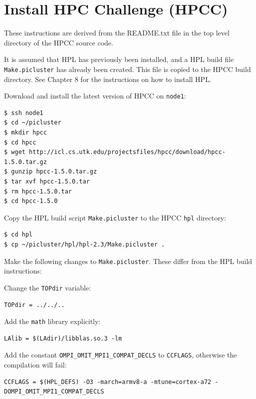\documentclass{report}
\begin{document}
%
%
\chapter{Install HPC Challenge (HPCC)}

These instructions are derived from the README.txt file in the top level directory of the HPCC source code.

It is assumed that HPL has previously been installed, and a HPL build file \verb|Make.picluster| has already been created. This file is copied to the HPCC build directory. See Chapter 8 for the instructions on how to install HPL.

Download and install the latest version of HPCC on \verb|node1|:

\lstset{style=type}
\begin{lstlisting}
$ ssh node1
$ cd ~/picluster
$ mkdir hpcc
$ cd hpcc
$ wget http://icl.cs.utk.edu/projectsfiles/hpcc/download/hpcc-1.5.0.tar.gz
$ gunzip hpcc-1.5.0.tar.gz
$ tar xvf hpcc-1.5.0.tar
$ rm hpcc-1.5.0.tar
$ cd hpcc-1.5.0
\end{lstlisting}

Copy the HPL build script \verb|Make.picluster| to the HPCC \verb|hpl| directory:

\lstset{style=type}
\begin{lstlisting}
$ cd hpl
$ cp ~/picluster/hpl/hpl-2.3/Make.picluster .
\end{lstlisting}

Make the following changes to \verb|Make.picluster|. These differ from the HPL build instructions:

Change the \verb|TOPdir| variable:

\lstset{style=hack}
\begin{lstlisting}[caption=Make.picluster]
TOPdir = ../../..
\end{lstlisting}

Add the \verb|math| library explicitly:

\lstset{style=hack}
\begin{lstlisting}[caption=Make.picluster]
LAlib = $(LAdir)/libblas.so.3 -lm
\end{lstlisting}

Add the constant \verb|OMPI_OMIT_MPI1_COMPAT_DECLS| to \verb|CCFLAGS|, otherwise the compilation will fail:

\lstset{style=hack}
\begin{lstlisting}[caption=Make.picluster]
CCFLAGS = $(HPL_DEFS) -O3 -march=armv8-a -mtune=cortex-a72 -DOMPI_OMIT_MPI1_COMPAT_DECLS
\end{lstlisting}
\end{document}
